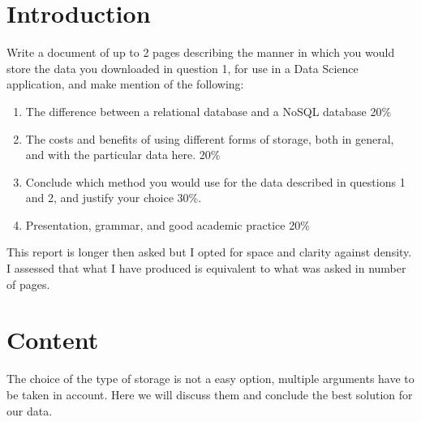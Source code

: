 \documentclass[8pt]{article}
\begin{document}
\section{Introduction}
Write a document of up to 2 pages describing the manner in which you would store the data you downloaded in question 1, for use in a Data Science application, and make mention of the following:
\begin{enumerate}
\item The difference between a relational database and a NoSQL database 20\%
\item The costs and benefits of using different forms of storage, both in general, and with the particular data here. 20\%
\item Conclude which method you would use for the data described in questions 1 and 2, and justify your choice 30\%.
\item Presentation, grammar, and good academic practice 20\%
\end{enumerate}
This report is longer then asked but I opted for space and clarity against density. I assessed that what I have produced is equivalent to what was asked in number of pages.

\section{Content}
The choice of the type of storage is not a easy option, multiple arguments have to be taken in account. Here we will discuss them and conclude the best solution for our data.
\end{document}
